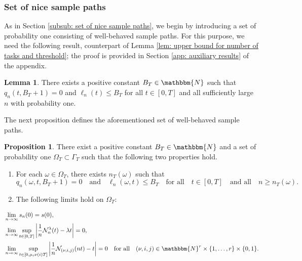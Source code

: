\documentclass[a4paper, 12pt]{article}
\theoremstyle{definition}
\newtheorem{proposition}[theorem]{Proposition}
\newtheorem{lemma}[theorem]{Lemma}
\newcommand{\calN}{\mathcal{N}}
\newcommand{\N}{\mathbbm{N}}
\begin{document}
\subsubsection{Set of nice sample paths}
\label{subsub: set of nice sample paths coxian case}

As in Section \ref{subsub: set of nice sample paths}, we begin by introducing a set of probability one consisting of  well-behaved sample paths. For this purpose, we need the following result, counterpart of Lemma \ref{lem: upper bound for number of tasks and threshold}; the proof is provided in Section \ref{app: auxiliary results} of the appendix.

\begin{lemma}
	\label{lem: upper bound for number of tasks and threshold coxian case}
	There exists a positive constant $B_T \in \N$ such that $q_n(t, B_T + 1) = 0$ and $\ell_n(t) \leq B_T$ for all $t \in [0, T]$ and all sufficiently large $n$ with probability one.
\end{lemma}

The next proposition defines the aforementioned set of well-behaved sample paths.

\begin{proposition}
	\label{prop: definition of Omega_T coxian case}
	There exist a positive constant $B_T \in \N$ and a set of probability one $\Omega_T \subset \Gamma_T$ such that the following two properties hold.
	\begin{enumerate}
		\item[(a)] For each $\omega \in \Omega_T$, there exists $n_T(\omega)$ such that
		\begin{equation}
			\label{eq: boundedness of occupancy states and thresholds coxian case}
			q_n(\omega, t, B_T + 1) = 0 \quad \text{and} \quad \ell_n(\omega, t) \leq B_T \quad \text{for all} \quad t \in [0, T] \quad \text{and all} \quad n \geq n_T(\omega).
		\end{equation}
		
		\item[(b)] The following limits hold on $\Omega_T$:
	\end{enumerate}
	\begin{subequations}
		\begin{align}
			&\lim_{n \to \infty} s_n(0) = s(0), \label{seq: convergence of initial conditions 2 coxian case} \\
			&\lim_{n \to \infty} \sup_{t \in [0, T]} \left|\frac{1}{n} \calN_n^\lambda(t) - \lambda t\right| = 0, \label{seq: fslln for arrivals 2 coxian case} \\
			&\lim_{n \to \infty} \sup_{t \in [0, \mu_i \nu(i) T]} \left|\frac{1}{n} \calN_{(\nu, i, j)}(nt) - t\right| = 0 \quad \text{for all} \quad (\nu, i, j) \in \N^r \times \{1, \dots, r\} \times \{0, 1\}. \label{seq: fslln for departures 2 coxian case}
		\end{align}
	\end{subequations}
\end{proposition}
\end{document}
